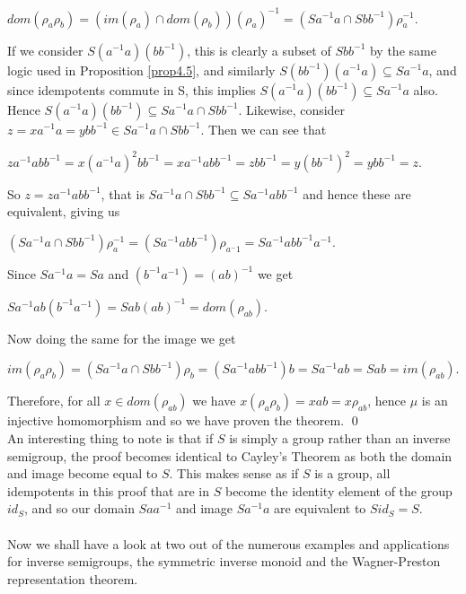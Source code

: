 \documentclass[12pt]{article}
\begin{document}
	\begin{center}
		$dom(\rho_a \rho_b) =(im(\rho_a)\cap dom(\rho_b))(\rho_a)^{-1} =(Sa^{-1}a \cap Sbb^{-1})\rho_a^{-1}$.
	\end{center}
	If we consider $S(a^{-1}a)(bb^{-1})$, this is clearly a subset of $Sbb^{-1}$ by the same logic used in Proposition \ref{prop4.5}, and similarly $S(bb^{-1})(a^{-1}a) \subseteq Sa^{-1}a$, and since idempotents commute in S, this implies $S(a^{-1}a)(bb^{-1}) \subseteq Sa^{-1}a$ also. Hence $S(a^{-1}a)(bb^{-1}) \subseteq Sa^{-1}a \cap Sbb^{-1}$. Likewise, consider $z =xa^{-1}a = ybb^{-1} \in Sa^{-1}a \cap Sbb^{-1}$. Then we can see that 
	\begin{center}
		$za^{-1}abb^{-1} = x(a^{-1}a)^2 bb^{-1} = xa^{-1}abb^{-1}=zbb^{-1}=y(bb^{-1})^2 = ybb^{-1}=z$.
	\end{center}
	So $z=za^{-1}abb^{-1}$, that is $Sa^{-1}a \cap Sbb^{-1} \subseteq Sa^{-1}abb^{-1}$ and hence these are equivalent, giving us
	\begin{center}
		$(Sa^{-1}a \cap Sbb^{-1})\rho_a^{-1} = (Sa^{-1}abb^{-1})\rho_{a^-1}=Sa^{-1}abb^{-1}a^{-1}$.
	\end{center}
	Since $Sa^{-1}a = Sa$ and $(b^{-1}a^{-1}) = (ab)^{-1}$ we get
	\begin{center}
		$Sa^{-1}ab(b^{-1}a^{-1}) = Sab(ab)^{-1} = dom(\rho_{ab})$.
	\end{center}
	Now doing the same for the image we get
	\begin{center}
		$im(\rho_a \rho_b) = (Sa^{-1}a \cap Sbb^{-1})\rho_b = (Sa^{-1}abb^{-1})b = Sa^{-1}ab = Sab = im(\rho_{ab})$.
	\end{center}
	Therefore, for all $x \in dom(\rho_{ab})$ we have $x(\rho_a \rho_b) = xab = x \rho_{ab}$, hence $\mu$ is an injective homomorphism and so we have proven the theorem.
\qed\\
An interesting thing to note is that if $S$ is simply a group rather than an inverse semigroup, the proof becomes identical to Cayley's Theorem as both the domain and image become equal to $S$\cite{3}. This makes sense as if $S$ is a group, all idempotents in this proof that are in $S$ become the identity element of the group $id_S$, and so our domain $Saa^{-1}$ and image $Sa^{-1}a$ are equivalent to $Sid_S = S$.\\
\\Now we shall have a look at two out of the numerous examples and applications for inverse semigroups, the symmetric inverse monoid and the Wagner-Preston representation theorem.
\end{document}
